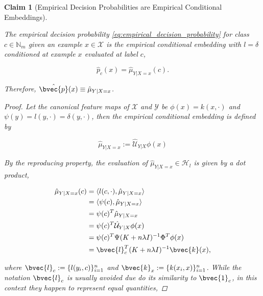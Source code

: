 \documentclass{article}
\newtheorem{claim}[theorem]{Claim}
\begin{document}
	\begin{claim}[Empirical Decision Probabilities are Empirical Conditional Embeddings]
	\label{thm:empirical_probability_is_embedding}
	
		The empirical decision probability \eqref{eq:empirical_decision_probability} for class $c \in \mathbb{N}_{m}$ given an example $x \in \mathcal{X}$ is the empirical conditional embedding with $l = \delta$ conditioned at example $x$ evaluated at label $c$,
			
		\begin{equation}
			\hat{p}_{c}(x) = \hat{\mu}_{Y | X = x}(c).
		\end{equation}
		
		Therefore, $\hat{\bvec{p}}(x) \equiv \hat{\mu}_{Y | X = x}$.
				
		\begin{proof}
			
			Let the canonical feature maps of $\mathcal{X}$ and $\mathcal{Y}$ be $\phi(x) = k(x, \cdot)$ and $\psi(y) = l(y, \cdot) = \delta(y, \cdot)$, then the empirical conditional embedding is defined by
			
			\begin{equation}
				\hat{\mu}_{Y | X = x} := \hat{\mathcal{U}}_{Y | X} \phi(x)
			\end{equation}
			
			By the reproducing property, the evaluation of $\hat{\mu}_{Y | X = x} \in \mathcal{H}_{l}$ is given by a dot product,
	
			\begin{equation}
			\begin{aligned}
				\hat{\mu}_{Y | X = x}(c) &= \langle l(c, \cdot), \hat{\mu}_{Y | X = x} \rangle \\
				&= \langle \psi(c), \hat{\mu}_{Y | X = x} \rangle \\
				&= \psi(c)^{T} \hat{\mu}_{Y | X = x} \\
				&= \psi(c)^{T} \hat{\mathcal{U}}_{Y | X} \phi(x) \\
				&= \psi(c)^{T} \Psi (K + n \lambda I)^{-1} \Phi^{T} \phi(x) \\
				&= \bvec{l}_{c}^{T} (K + n \lambda I)^{-1} \bvec{k}(x), \\
			\end{aligned}
			\end{equation}
			
			where $\bvec{l}_{c} := \{l(y_{i}, c)\}_{i = 1}^{n}$ and $\bvec{k}_{x} := \{k(x_{i}, x)\}_{i = 1}^{n}$. While the notation $\bvec{l}_{c}$ is usually avoided due do its similarity to $\bvec{1}_{c}$, in this context they happen to represent equal quantities,
			

\end{proof}
\end{claim}
\end{document}
